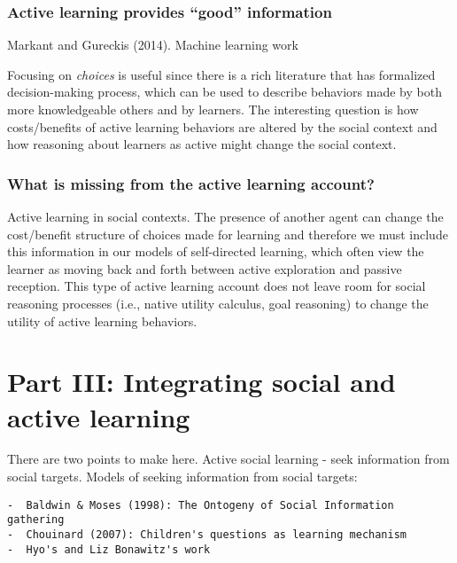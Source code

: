 \documentclass[a4paper,man,apacite,floatsintext]{apa6}
\begin{document}
\subsubsection{\texorpdfstring{Active learning provides ``good''
information}{Active learning provides good information}}\label{active-learning-provides-good-information}

Markant and Gureckis (2014). Machine learning work

Focusing on \emph{choices} is useful since there is a rich literature
that has formalized decision-making process, which can be used to
describe behaviors made by both more knowledgeable others and by
learners. The interesting question is how costs/benefits of active
learning behaviors are altered by the social context and how reasoning
about learners as active might change the social context.

\subsubsection{What is missing from the active learning
account?}\label{what-is-missing-from-the-active-learning-account}

Active learning in social contexts. The presence of another agent can
change the cost/benefit structure of choices made for learning and
therefore we must include this information in our models of
self-directed learning, which often view the learner as moving back and
forth between active exploration and passive reception. This type of
active learning account does not leave room for social reasoning
processes (i.e., native utility calculus, goal reasoning) to change the
utility of active learning behaviors.

\section{Part III: Integrating social and active
learning}\label{part-iii-integrating-social-and-active-learning}

There are two points to make here. Active social learning - seek
information from social targets. Models of seeking information from
social targets:

\begin{verbatim}
-  Baldwin & Moses (1998): The Ontogeny of Social Information gathering
-  Chouinard (2007): Children's questions as learning mechanism
-  Hyo's and Liz Bonawitz's work
\end{verbatim}
\end{document}
